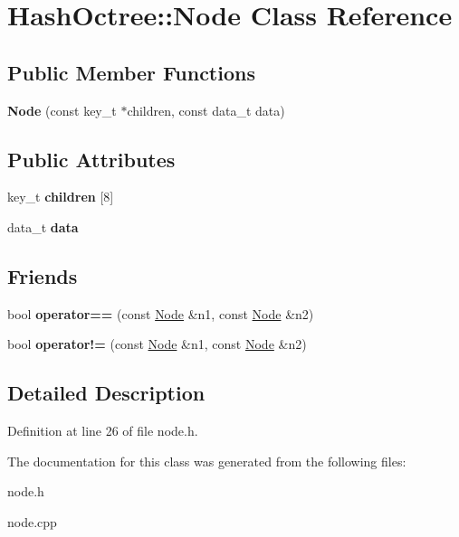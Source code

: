 \hypertarget{class_hash_octree_1_1_node}{}\section{Hash\+Octree\+::Node Class Reference}
\label{class_hash_octree_1_1_node}
\subsection*{Public Member Functions}
\begin{DoxyCompactItemize}
\item 
\mbox{\label{class_hash_octree_1_1_node_a7fc58bef4d8ae975f82c7fff2108546e}} 
{\bfseries Node} (const key\+\_\+t $\ast$children, const data\+\_\+t data)
\end{DoxyCompactItemize}
\subsection*{Public Attributes}
\begin{DoxyCompactItemize}
\item 
\mbox{\label{class_hash_octree_1_1_node_a5f588a6c54aa700b4e15d58fd76570a7}} 
key\+\_\+t {\bfseries children} \mbox{[}8\mbox{]}
\item 
\mbox{\label{class_hash_octree_1_1_node_a2a508193dd697439e07fcbf7ee49a563}} 
data\+\_\+t {\bfseries data}
\end{DoxyCompactItemize}
\subsection*{Friends}
\begin{DoxyCompactItemize}
\item 
\mbox{\label{class_hash_octree_1_1_node_a156456698e98563a77c4c0af13c20db1}} 
bool {\bfseries operator==} (const \mbox{\hyperlink{class_hash_octree_1_1_node}{Node}} \&n1, const \mbox{\hyperlink{class_hash_octree_1_1_node}{Node}} \&n2)
\item 
\mbox{\label{class_hash_octree_1_1_node_ab6e5d53f0f5779ea42a87e85a1f79277}} 
bool {\bfseries operator!=} (const \mbox{\hyperlink{class_hash_octree_1_1_node}{Node}} \&n1, const \mbox{\hyperlink{class_hash_octree_1_1_node}{Node}} \&n2)
\end{DoxyCompactItemize}


\subsection{Detailed Description}


Definition at line 26 of file node.\+h.



The documentation for this class was generated from the following files\+:\begin{DoxyCompactItemize}
\item 
node.\+h\item 
node.\+cpp\end{DoxyCompactItemize}
